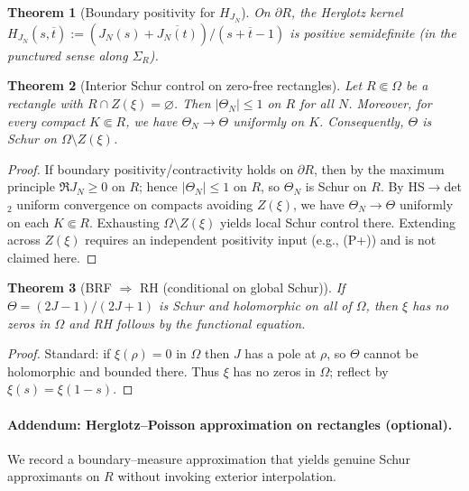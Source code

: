 \documentclass[11pt]{article}
\newtheorem{theorem}{Theorem}
\theoremstyle{remark}
\begin{document}
\begin{theorem}[Boundary positivity for \(H_{J_N}\)]\label{thm:boundary-psd-formal}
On \(\partial R\), the Herglotz kernel \(H_{J_N}(s,\overline t):=(J_N(s)+\overline{J_N(t)})/(s+\overline t-1)\) is positive semidefinite (in the punctured sense along \(\Sigma_R\)).
\end{theorem}

\begin{theorem}[Interior Schur control on zero-free rectangles]\label{thm:UIC}
Let \(R\Subset\Omega\) be a rectangle with \(R\cap Z(\xi)=\varnothing\). Then \(|\Theta_N|\le 1\) on \(R\) for all \(N\). Moreover, for every compact \(K\Subset R\), we have \(\Theta_N\to\Theta\) uniformly on \(K\). Consequently, \(\Theta\) is Schur on \(\Omega\setminus Z(\xi)\).
\end{theorem}
\begin{proof}
If boundary positivity/contractivity holds on \(\partial R\), then by the maximum principle \(\Re J_N\ge0\) on \(R\); hence \(|\Theta_N|\le 1\) on \(R\), so \(\Theta_N\) is Schur on \(R\). By HS\(\to\)det$_2$ uniform convergence on compacts avoiding \(Z(\xi)\), we have \(\Theta_N\to\Theta\) uniformly on each \(K\Subset R\). Exhausting \(\Omega\setminus Z(\xi)\) yields local Schur control there. Extending across \(Z(\xi)\) requires an independent positivity input (e.g., (P+)) and is not claimed here.
\end{proof}

\begin{theorem}[BRF \(\Rightarrow\) RH (conditional on global Schur)]\label{thm:brf-rh-final}
If \(\Theta=(2J-1)/(2J+1)\) is Schur and holomorphic on all of \(\Omega\), then \(\xi\) has no zeros in \(\Omega\) and RH follows by the functional equation.
\end{theorem}
\begin{proof}
Standard: if \(\xi(\rho)=0\) in \(\Omega\) then \(J\) has a pole at \(\rho\), so \(\Theta\) cannot be holomorphic and bounded there. Thus \(\xi\) has no zeros in \(\Omega\); reflect by \(\xi(s)=\xi(1-s)\).
\end{proof}

\paragraph{Addendum: Herglotz--Poisson approximation on rectangles (optional).}
We record a boundary--measure approximation that yields genuine Schur approximants on \(R\) without invoking exterior interpolation.
\end{document}
